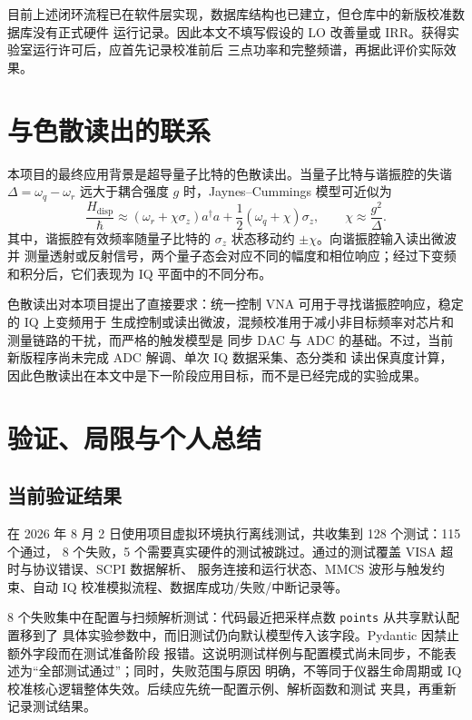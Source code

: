 \documentclass[UTF8,zihao=-4,a4paper]{ctexart}
\begin{document}
目前上述闭环流程已在软件层实现，数据库结构也已建立，但仓库中的新版校准数据库没有正式硬件
运行记录。因此本文不填写假设的 LO 改善量或 IRR。获得实验室运行许可后，应首先记录校准前后
三点功率和完整频谱，再据此评价实际效果。

\section{与色散读出的联系}

本项目的最终应用背景是超导量子比特的色散读出。当量子比特与谐振腔的失谐
$\Delta=\omega_q-\omega_r$ 远大于耦合强度 $g$ 时，Jaynes--Cummings 模型可近似为
\begin{equation}
  \frac{H_{\mathrm{disp}}}{\hbar}
  \approx(\omega_r+\chi\sigma_z)a^\dagger a
  +\frac{1}{2}(\omega_q+\chi)\sigma_z,
  \qquad \chi\approx\frac{g^2}{\Delta}.
  \label{eq:dispersive}
\end{equation}
其中，谐振腔有效频率随量子比特的 $\sigma_z$ 状态移动约 $\pm\chi$。向谐振腔输入读出微波并
测量透射或反射信号，两个量子态会对应不同的幅度和相位响应；经过下变频和积分后，它们表现为
IQ 平面中的不同分布\cite{gambetta2006,blais2021}。

色散读出对本项目提出了直接要求：统一控制 VNA 可用于寻找谐振腔响应，稳定的 IQ 上变频用于
生成控制或读出微波，混频校准用于减小非目标频率对芯片和测量链路的干扰，而严格的触发模型是
同步 DAC 与 ADC 的基础。不过，当前新版程序尚未完成 ADC 解调、单次 IQ 数据采集、态分类和
读出保真度计算，因此色散读出在本文中是下一阶段应用目标，而不是已经完成的实验成果。

\section{验证、局限与个人总结}

\subsection{当前验证结果}

在 2026 年 8 月 2 日使用项目虚拟环境执行离线测试，共收集到 128 个测试：115 个通过，
8 个失败，5 个需要真实硬件的测试被跳过。通过的测试覆盖 VISA 超时与协议错误、SCPI 数据解析、
服务连接和运行状态、MMCS 波形与触发约束、自动 IQ 校准模拟流程、数据库成功/失败/中断记录等。

8 个失败集中在配置与扫频解析测试：代码最近把采样点数 \texttt{points} 从共享默认配置移到了
具体实验参数中，而旧测试仍向默认模型传入该字段。Pydantic 因禁止额外字段而在测试准备阶段
报错。这说明测试样例与配置模式尚未同步，不能表述为“全部测试通过”；同时，失败范围与原因
明确，不等同于仪器生命周期或 IQ 校准核心逻辑整体失效。后续应先统一配置示例、解析函数和测试
夹具，再重新记录测试结果。
\end{document}
